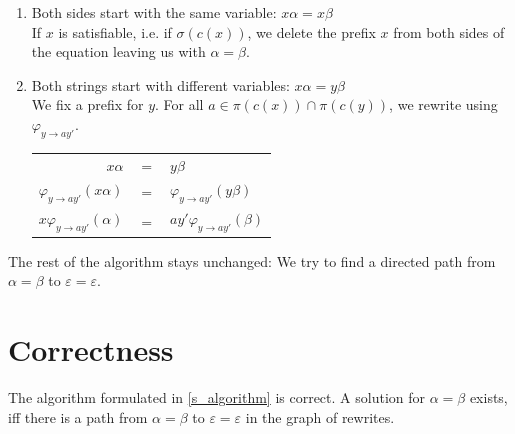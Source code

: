 \begin{enumerate}
    \item \label{rnt_xx}
        Both sides start with the same variable: $x\alpha = x\beta$ \\
        If $x$ is satisfiable, i.e. if $\sigma(c(x))$, we delete the prefix $x$ from both sides of the equation leaving us with $\alpha = \beta$.
    
    \newpage
    
    \item \label{rnt_xy}
        Both strings start with different variables: $x\alpha = y\beta$ \\
        We fix a prefix for $y$. For all $a \in \pi(c(x)) \cap \pi(c(y))$, we rewrite using $\varphi_{y \rightarrow ay'}$.
        
        \begin{center}
        \begin{tabular}{r c l}
            $x\alpha$ & $=$ & $y\beta$ \\
            $\varphi_{y \rightarrow ay'}(x\alpha)$ & $=$ & $\varphi_{y \rightarrow ay'}(y\beta)$ \\
            $x\varphi_{y \rightarrow ay'}(\alpha)$ & $=$ & $ay'\varphi_{y \rightarrow ay'}(\beta)$ \\
        \end{tabular}
        \end{center}
\end{enumerate}

The rest of the algorithm stays unchanged: We try to find a directed path from $\alpha = \beta$ to $\varepsilon = \varepsilon$.

\section{Correctness}
\begin{theorem}
The algorithm formulated in \ref{s_algorithm} is correct. A solution for $\alpha = \beta$ exists, iff there is a path from $\alpha = \beta$ to $\varepsilon = \varepsilon$ in the graph of rewrites.
\end{theorem}

